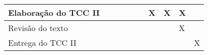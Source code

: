 \begin{table}[h]
\begin{tabular}{|l|l|l|l|l|l|l|l|l|l|}
		Elaboração do TCC II                                                               &                                                                                  &                                                                                  &                                                             &                                                                                  &                                                                                  & X                                                                                & X                                                                                & X                                                                                &                                                                                  \\ \hline
		Revisão do texto                                                                   &                                                                                  &                                                                                  &                                                             &                                                                                  &                                                                                  &                                                                                  &                                                                                  & X                                                                                &                                                                                  \\ \hline
		Entrega do TCC II                                                                  &                                                                                  &                                                                                  &                                                             &                                                                                  &                                                                                  &                                                                                  &                                                                                  &                                                                                  & X                                                                                \\ \hline

\end{tabular}
\end{table}
